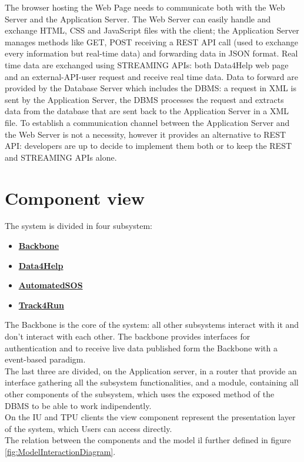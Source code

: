 The browser hosting the Web Page needs to communicate both with the Web Server and the Application Server. 
The Web Server can easily handle and exchange HTML, CSS and JavaScript files with the client; the Application Server manages methods like GET, POST receiving a REST API call (used to exchange every information but real-time data) and forwarding data in JSON format. Real time data are exchanged using STREAMING APIs: both Data4Help web page and an external-API-user request and receive real time data. Data to forward are provided by the Database Server which includes the DBMS: a request in XML is sent by the Application Server, the DBMS processes the request and extracts data from the database that are sent back to the Application Server in a XML file. To establish a communication channel between the Application Server and the Web Server is not a necessity, however it provides an alternative to REST API: developers are up to decide to implement them both or to keep the REST and STREAMING APIs alone. 


\section{Component view}
\label{sect:ComponetView}
The system is divided in four subsystem:
\begin{itemize}
\item \textbf{\hyperref[subsect:backboneComponentView]{Backbone}}
\item \textbf{\hyperref[subsect:D4HComponentView]{Data4Help}}
\item \textbf{\hyperref[subsect:ASOSComponentView]{AutomatedSOS}}
\item \textbf{\hyperref[subsect:T4RComponentView]{Track4Run}}
\end{itemize}
The Backbone is the core of the system: all other subsystems interact with it and don't interact with each other. The backbone provides interfaces for authentication and to receive live data published form the Backbone with a event-based paradigm.\\
The last three are divided, on the Application server, in a router that provide an interface gathering all the subsystem functionalities, and a module, containing all other components of the subsystem, which uses the exposed method of the DBMS to be able to work indipendently. \\
On the IU and TPU clients the view component represent the presentation layer of the system, which Users can access directly.\\
The relation between the components and the model il further defined in figure \ref{fig:ModelInteractionDiagram}.
